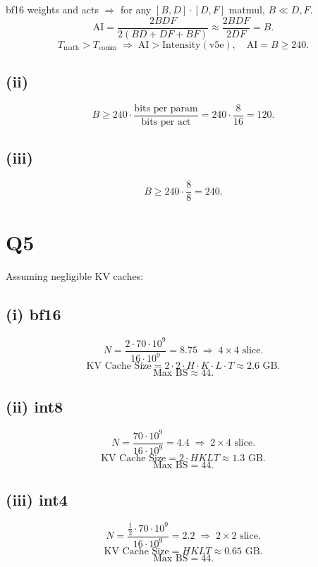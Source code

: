 \documentclass[11pt]{article}
\newcommand{\Tmath}{T_{\text{math}}}
\newcommand{\Tcomm}{T_{\text{comm}}}
\begin{document}
bf16 weights and acts $\Rightarrow$ for any $[B,D] \cdot [D,F]$ matmul, $B \ll D, F$.
\[
\text{AI} = \frac{2BDF}{2(BD + DF + BF)} \approx \frac{2BDF}{2DF} = B.
\]
\[
\Tmath > \Tcomm \;\Rightarrow\; \text{AI} > \text{Intensity}(\text{v5e}), \quad \text{AI} = B \geq 240.
\]

\subsection*{(ii)}

\[
B \geq 240 \cdot \frac{\text{bits per param}}{\text{bits per act}} = 240 \cdot \frac{8}{16} = 120.
\]

\subsection*{(iii)}

\[
B \geq 240 \cdot \frac{8}{8} = 240.
\]

\section*{Q5}

Assuming negligible KV caches:

\subsection*{(i) bf16}

\[
N = \frac{2 \cdot 70 \cdot 10^9}{16 \cdot 10^9} = 8.75 \;\Rightarrow\; 4 \times 4 \text{ slice}.
\]
\[
\text{KV Cache Size} = 2 \cdot 2 \cdot H \cdot K \cdot L \cdot T \approx 2.6 \text{ GB.}
\]
\[
\text{Max BS} \approx 44.
\]

\subsection*{(ii) int8}

\[
N = \frac{70 \cdot 10^9}{16 \cdot 10^9} = 4.4 \;\Rightarrow\; 2 \times 4 \text{ slice}.
\]
\[
\text{KV Cache Size} = 2 \cdot HKLT \approx 1.3 \text{ GB.}
\]
\[
\text{Max BS} = 44.
\]

\subsection*{(iii) int4}

\[
N = \frac{\frac{1}{2} \cdot 70 \cdot 10^9}{16 \cdot 10^9} = 2.2 \;\Rightarrow\; 2 \times 2 \text{ slice}.
\]
\[
\text{KV Cache Size} = HKLT \approx 0.65 \text{ GB.}
\]
\[
\text{Max BS} = 44.
\]
\end{document}
